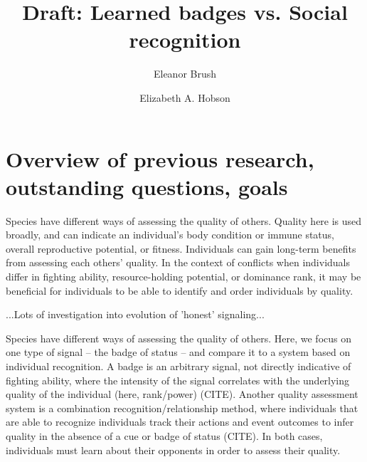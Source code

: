 

\noindent
\title{Draft: Learned badges vs. Social recognition} 

\author[1]{Eleanor Brush}
\author[2,3,4]{Elizabeth A. Hobson}
\maketitle

\section*{Overview of previous research, outstanding questions, goals} 

Species have different ways of assessing the quality of others. Quality here is used broadly, and can indicate an individual's body condition or immune status, overall reproductive potential, or fitness. Individuals can gain long-term benefits from assessing each others' quality. In the context of conflicts when individuals differ in fighting ability, resource-holding potential, or dominance rank, it may be beneficial for individuals to be able to identify and order individuals by quality. 

...Lots of investigation into evolution of 'honest' signaling...  



Species have different ways of assessing the quality of others. Here, we focus on one type of signal -- the badge of status -- and compare it to a system based on individual recognition. A badge is an arbitrary signal, not directly indicative of fighting ability, where the intensity of the signal correlates with the underlying quality of the individual (here, rank/power) (CITE). Another quality assessment system is a combination recognition/relationship method, where individuals that are able to recognize individuals track their actions and event outcomes to infer quality in the absence of a cue or badge of status (CITE). In both cases, individuals must learn about their opponents in order to assess their quality.

